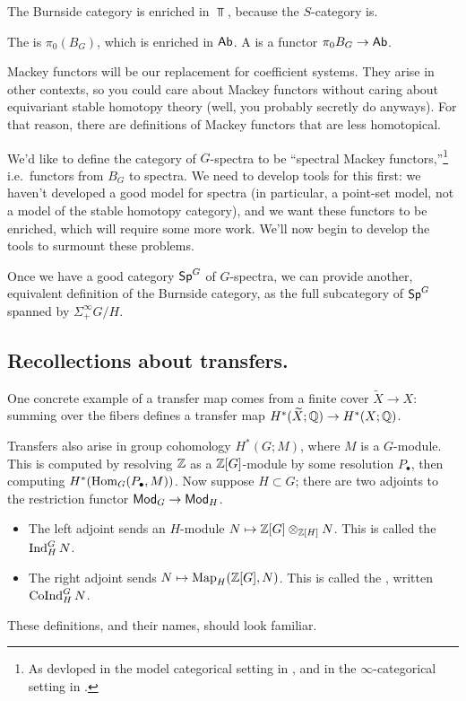 The Burnside category is enriched in $\Top$, because the $S$-category is.
\begin{defn}
The  is $\pi_0(B_G)$, which is
enriched in $\mathsf{Ab}$. A  is a functor $\pi_0B_G\to\mathsf{Ab}$.
\end{defn}
Mackey functors will be our replacement for coefficient systems. They arise in other contexts, so you could care
about Mackey functors without caring about equivariant stable homotopy theory (well, you probably secretly do
anyways). For that reason, there are definitions of Mackey functors that are less homotopical.

We'd like to define the category of $G$-spectra to be ``spectral Mackey functors,''\footnote{As devloped in the model
categorical setting in \cite{GuillouMay}, and in the $\infty$-categorical setting in \cite{cB2017}.} i.e.\ functors from $B_G$ to
spectra. We need to develop tools for this first: we haven't developed a good model for spectra (in particular, a
point-set model, not a model of the stable homotopy category), and we want these functors to be enriched, which
will require some more work. We'll now begin to develop the tools to surmount these
problems.
\begin{rem}
Once we have a good category $\mathsf{Sp}^G$ of $G$-spectra, we can provide another, equivalent definition of the Burnside
category, as the full subcategory of $\mathsf{Sp}^G$ spanned by $\Sigma_+^\infty G/H$.
\end{rem}
\subsection*{Recollections about transfers.}
One concrete example of a transfer map comes from a finite cover $\widetilde X\to X$: summing over the fibers
defines a transfer map $H^*(\widetilde X;\mathbb Q)\to H^*(X;\mathbb Q)$.

Transfers also arise in group cohomology $H^*(G;M)$, where $M$ is a $G$-module. This is computed by resolving $\mathbb Z$
as a $\mathbb Z[G]$-module by some resolution $P_\bullet$, then computing $H^*(\operatorname{Hom}_G(P_\bullet, M))$. Now suppose
$H\subset G$; there are two adjoints to the restriction functor $\mathsf{Mod}_G\to\mathsf{Mod}_H$.
\begin{itemize}
	\item The left adjoint sends an $H$-module $N\mapsto \Z[G]\otimes_{\Z[H]} N$. This is called the  $\operatorname{Ind}_H^G N$.
	\item The right adjoint sends $N\mapsto\Map_H(\Z[G], N)$. This is called the , written $\operatorname{CoInd}_H^GN$.
\end{itemize}
These definitions, and their names, should look familiar.

